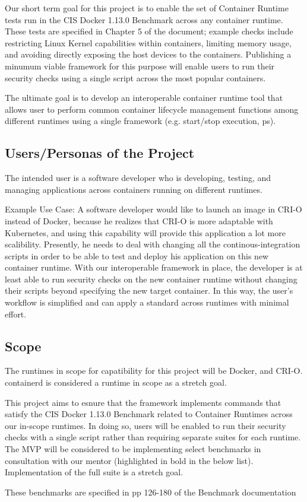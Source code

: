 Our short term goal for this project is to enable the set of Container Runtime tests run in the CIS Docker 1.13.0 Benchmark across any container runtime. These tests are specified in Chapter 5 of the document; example checks include restricting Linux Kernel capabilities within containers, limiting memory usage, and avoiding directly exposing the host devices to the containers. Publishing a minumum viable framework for this purpose will enable users to run their security checks using a single script across the most popular containers.

The ultimate goal is to develop an interoperable container runtime tool that allows user to perform common container lifecycle management functions among different runtimes using a single framework (e.g. start/stop execution, ps).

\subsection*{Users/Personas of the Project}
The intended user is a software developer who is developing, testing, and managing applications across containers running on different runtimes.

Example Use Case: A software developer would like to launch an image in CRI-O instead of Docker, because he realizes that CRI-O is more adaptable with Kubernetes, and using this capability will provide this application a lot more scalibility. Presently, he needs to deal with changing all the continous-integration scripts in order to be able to test and deploy his application on this new container runtime. With our interoperable framework in place, the developer is at least able to run security checks on the new container runtime without changing their scripts beyond specifying the new target container. In this way, the user's workflow is simplified and can apply a standard across runtimes with minimal effort.

\subsection*{Scope}
The runtimes in scope for capatibility for this project will be Docker, and CRI-O. containerd is considered a runtime in scope as a stretch goal.

This project aims to esnure that the framework implements commands that satisfy the CIS Docker 1.13.0 Benchmark related to Container Runtimes across our in-scope runtimes. In doing so, users will be enabled to run their security checks with a single script rather than requiring separate suites for each runtime. The MVP will be considered to be implementing select benchmarks in consultation with our mentor (highlighted in bold in the below list). Implementation of the full suite is a stretch goal.

These benchmarks are specified in pp 126-180 of the Benchmark documentation